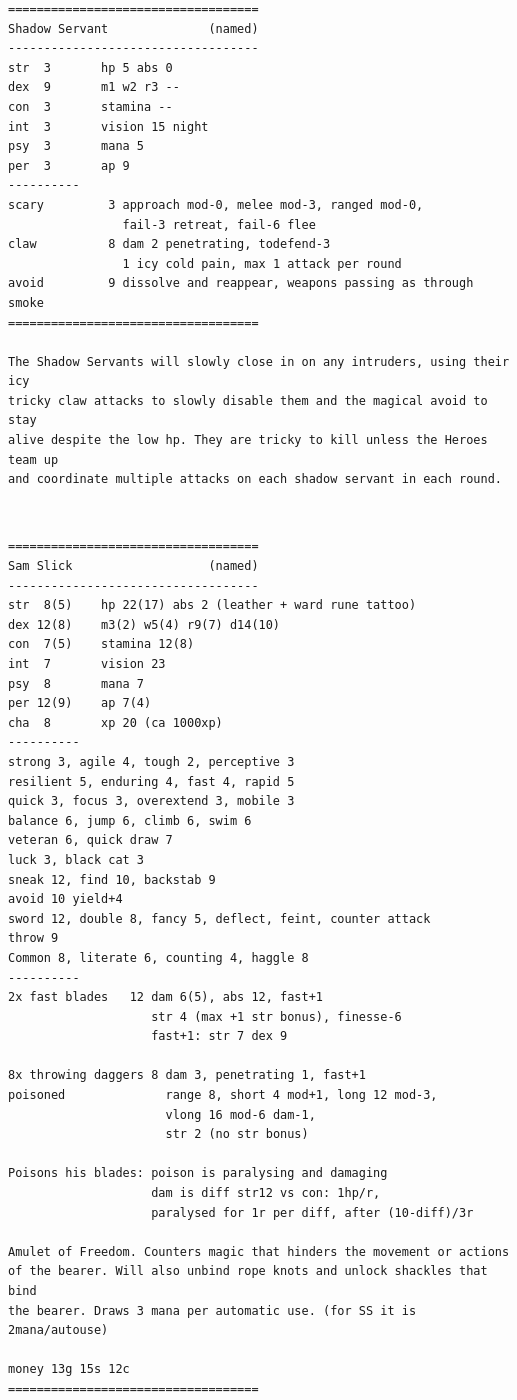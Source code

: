 \goodbreak \begin{samepage} \vsmall \begin{verbatim}
===================================
Shadow Servant              (named)
-----------------------------------
str  3       hp 5 abs 0
dex  9       m1 w2 r3 --
con  3       stamina --
int  3       vision 15 night
psy  3       mana 5
per  3       ap 9
----------
scary         3 approach mod-0, melee mod-3, ranged mod-0,
                fail-3 retreat, fail-6 flee
claw          8 dam 2 penetrating, todefend-3
                1 icy cold pain, max 1 attack per round
avoid         9 dissolve and reappear, weapons passing as through smoke
===================================

The Shadow Servants will slowly close in on any intruders, using their icy
tricky claw attacks to slowly disable them and the magical avoid to stay
alive despite the low hp. They are tricky to kill unless the Heroes team up
and coordinate multiple attacks on each shadow servant in each round.
\end{verbatim} \normalsize \end{samepage}

\

\goodbreak \begin{samepage} \vsmall \begin{verbatim}
===================================
Sam Slick                   (named)
-----------------------------------
str  8(5)    hp 22(17) abs 2 (leather + ward rune tattoo)
dex 12(8)    m3(2) w5(4) r9(7) d14(10)
con  7(5)    stamina 12(8)
int  7       vision 23
psy  8       mana 7
per 12(9)    ap 7(4)
cha  8       xp 20 (ca 1000xp)
----------
strong 3, agile 4, tough 2, perceptive 3
resilient 5, enduring 4, fast 4, rapid 5
quick 3, focus 3, overextend 3, mobile 3
balance 6, jump 6, climb 6, swim 6
veteran 6, quick draw 7
luck 3, black cat 3
sneak 12, find 10, backstab 9
avoid 10 yield+4
sword 12, double 8, fancy 5, deflect, feint, counter attack
throw 9
Common 8, literate 6, counting 4, haggle 8
----------
2x fast blades   12 dam 6(5), abs 12, fast+1
                    str 4 (max +1 str bonus), finesse-6
                    fast+1: str 7 dex 9

8x throwing daggers 8 dam 3, penetrating 1, fast+1
poisoned              range 8, short 4 mod+1, long 12 mod-3,
                      vlong 16 mod-6 dam-1,
                      str 2 (no str bonus)

Poisons his blades: poison is paralysing and damaging
                    dam is diff str12 vs con: 1hp/r,
                    paralysed for 1r per diff, after (10-diff)/3r

Amulet of Freedom. Counters magic that hinders the movement or actions
of the bearer. Will also unbind rope knots and unlock shackles that bind
the bearer. Draws 3 mana per automatic use. (for SS it is 2mana/autouse)

money 13g 15s 12c
===================================
\end{verbatim} \normalsize \end{samepage}

